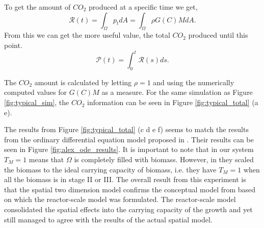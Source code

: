 To get the amount of $CO_2$ produced at a specific time we get,
\begin{equation}
  \mathcal{R}(t) = \int_\Omega p_t dA = \int_\Omega \rho G(C) M dA.
\end{equation}
From this we can get the more useful value, the total $CO_2$ produced until this point.
\begin{equation}
  \mathcal{P}(t) = \int^t_0 \mathcal{R}(s) ds.
\end{equation}

The $CO_2$ amount is calculated by letting $\rho = 1$ and using the numerically computed values for $G(C)M$ as a measure.
For the same simulation as Figure \ref{fig:typical_sim}, the $CO_2$ information can be seen in Figure \ref{fig:typical_total} (a e).

The results from Figure \ref{fig:typical_total} (c d e f) seems to match the results from the ordinary differential equation model proposed in \cite{dumitrache2015mathematicalModeling}.
Their results can be seen in Figure \ref{fig:alex_ode_results}.
It is important to note that in our system $T_M = 1 $ means that $\Omega$ is completely filled with biomass.
However, in \cite{dumitrache2015mathematicalModeling} they scaled the biomass to the ideal carrying capacity of biomass, i.e. they have $T_M = 1$ when all the biomass is in stage II or III.
The overall result from this experiment is that the spatial two dimension model confirms the conceptual model from \cite{dumitrache2015mathematicalModeling} based on which the reactor-scale model was formulated.
The reactor-scale model consolidated the spatial effects into the carrying capacity of the growth and yet still managed to agree with the results of the actual spatial model.

